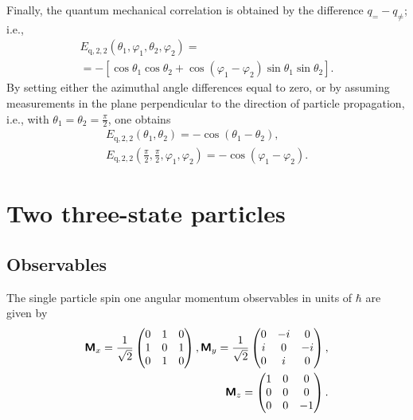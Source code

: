 Finally, the quantum mechanical correlation is obtained by  the difference $q_= -q_{\neq }$; i.e.,
\begin{equation}
\begin{split}
E_{\text{q},2,2}\left(\theta_1, \varphi_1 ,\theta_2,\varphi_2 \right)= \\
= -\left[\cos \theta_1 \cos \theta_2 + \cos (\varphi_1 - \varphi_2) \sin \theta_1 \sin \theta_2\right]
.
\end{split}
\label{2009-gtq-gme22}
\end{equation}
By setting either the azimuthal angle differences equal to zero,
or by assuming measurements in the plane perpendicular to the direction of particle propagation,
i.e., with $\theta_1=\theta_2 =\frac{\pi}{2}$,
one obtains
\begin{equation}
\label{2009-gtq-edosgc}
\begin{split}
E_{\text{q},2,2}(\theta_1,\theta_2)= -\cos (\theta_1 - \theta_2),\\
E_{\text{q},2,2}(\frac{\pi}{2},\frac{\pi}{2},\varphi_1 , \varphi_2) = - \cos (\varphi_1 - \varphi_2).
\end{split}
\end{equation}





\section{Two three-state particles}

\subsection{Observables}
The single particle  spin one angular momentum observables in units of $\hbar$ are given by~\cite{schiff-55}
\begin{equation}
\begin{split}
\textsf{\textbf{M}}_x=
\frac{1}{\sqrt{2}}
\begin{pmatrix}
0&1&0\\
1&0&1\\
0&1&0
\end{pmatrix}  ,
\textsf{\textbf{M}}_y=
\frac{1}{\sqrt{2}}
\begin{pmatrix}
0&-i&0\\
i&0&-i\\
0&i&0
\end{pmatrix}  ,
\\
\textsf{\textbf{M}}_z=
\begin{pmatrix}
1&0&0\\
0&0&0\\
0&0&-1
\end{pmatrix}
.
\end{split}
\end{equation}



